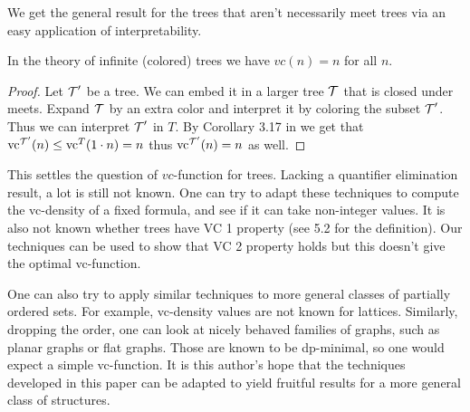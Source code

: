 We get the general result for the trees that aren't necessarily meet trees via an easy application of interpretability.
\begin{Corollary}
  In the theory of infinite (colored) trees we have $vc(n) = n$ for all $n$.
\end{Corollary}
\begin{proof}
  Let $\operatorname{\mathcal T}'$ be a tree. We can embed it in a larger tree $\operatorname{\mathcal T}$ that is closed under meets. Expand $\operatorname{\mathcal T}$ by an extra color and interpret it by coloring the subset $\operatorname{\mathcal T}'$. Thus we can interpret $\operatorname{\mathcal T}'$ in $T$. By Corollary 3.17 in \cite{density} we get that $\operatorname{vc}^{\operatorname{\mathcal T}'}(n) \leq \operatorname{vc}^T(1 \cdot n) = n$ thus $\operatorname{vc}^{\operatorname{\mathcal T}'}(n) = n$ as well.
\end{proof}

This settles the question of $vc$-function for trees. Lacking a quantifier elimination result, a lot is still not known.
One can try to adapt these techniques to compute the vc-density of a fixed formula, and see if it can take non-integer values.
It is also not known whether trees have VC 1 property (see \cite{density} 5.2 for the definition).
Our techniques can be used to show that VC 2 property holds but this doesn't give the optimal vc-function.

One can also try to apply similar techniques to more general classes of partially ordered sets.
For example, vc-density values are not known for lattices.
Similarly, dropping the order, one can look at nicely behaved families of graphs, such as planar graphs or flat graphs.
Those are known to be dp-minimal, so one would expect a simple vc-function.
It is this author's hope that the techniques developed in this paper can be adapted to yield fruitful results for a more general class of structures.
